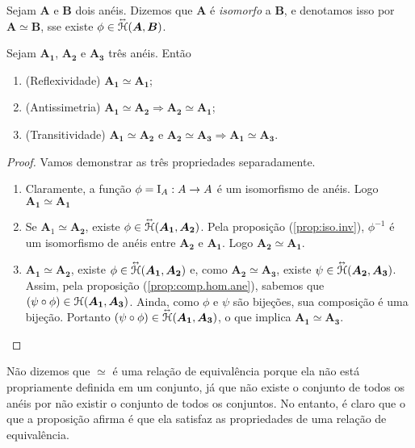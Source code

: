 \begin{definition}
	Sejam $\bm A$ e $\bm B$ dois anéis. Dizemos que $\bm A$ é \emph{isomorfo} a $\bm B$, e denotamos isso por $\bm A \simeq \bm B$, sse existe $\phi \in \accentset{\leftrightarrow}{\mathcal{H}}(\bm A,\bm B)$.
\end{definition}	

\begin{proposition}
	Sejam $\bm{A_1}$, $\bm{A_2}$ e $\bm{A_3}$ três anéis. Então
	\begin{enumerate}
	\item (Reflexividade) $\bm{A_1} \simeq \bm{A_1}$;
	\item (Antissimetria) $\bm{A_1} \simeq \bm{A_2} \Rightarrow \bm{A_2} \simeq \bm{A_1}$;
	\item (Transitividade) $\bm{A_1} \simeq \bm{A_2} \text{\ e\ } \bm{A_2} \simeq \bm{A_3} \Rightarrow \bm{A_1} \simeq \bm{A_3}$.
	\end{enumerate}
\end{proposition}
\begin{proof}
	Vamos demonstrar as três propriedades separadamente.
	\begin{enumerate}
	\item Claramente, a função $\phi=\mathrm{I}_A: A \to A$ é um isomorfismo de anéis. Logo $\bm{A_1} \simeq \bm{A_1}$
	\item Se $\textbf{A}_1 \simeq \bm{A_2}$, existe $\phi \in \accentset{\leftrightarrow}{\mathcal{H}}(\bm{A_1},\bm{A_2})$. Pela proposição (\ref{prop:iso.inv}), $\phi^{-1}$ é um isomorfismo de anéis entre $\bm{A_2}$ e $\bm{A_1}$. Logo $\bm{A_2} \simeq \bm{A_1}$.
	\item $\bm{A_1} \simeq \bm{A_2}$, existe $\phi \in \accentset{\leftrightarrow}{\mathcal{H}}(\bm{A_1},\bm{A_2})$ e, como $\bm{A_2} \simeq \bm{A_3}$, existe $\psi \in \accentset{\leftrightarrow}{\mathcal{H}}(\bm{A_2},\bm{A_3})$. Assim, pela proposição (\ref{prop:comp.hom.ane}), sabemos que $(\psi \circ \phi) \in \mathcal{H}(\bm{A_1},\bm{A_3})$. Ainda, como $\phi$ e $\psi$ são bijeções, sua composição é uma bijeção. Portanto $(\psi \circ \phi) \in \accentset{\leftrightarrow}{\mathcal{H}}(\bm{A_1},\bm{A_3})$, o que implica $\bm{A_1} \simeq \bm{A_3}$.
	\end{enumerate}
\end{proof}

Não dizemos que $\simeq$ é uma relação de equivalência porque ela não está propriamente definida em um conjunto, já que não existe o conjunto de todos os anéis por não existir o conjunto de todos os conjuntos. No entanto, é claro que o que a proposição afirma é que ela satisfaz as propriedades de uma relação de equivalência.

